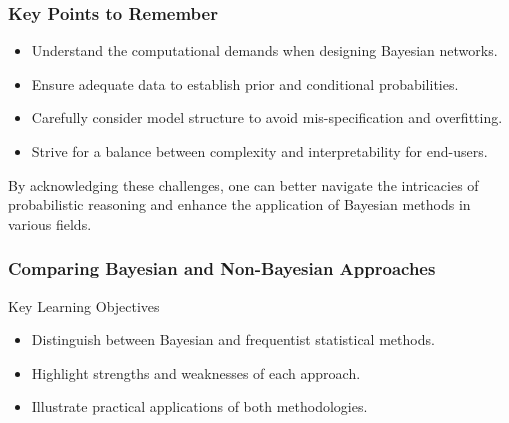 \documentclass[aspectratio=169]{beamer}
\begin{document}
\begin{frame}[fragile]
    \frametitle{Key Points to Remember}
    \begin{itemize}
        \item Understand the computational demands when designing Bayesian networks.
        \item Ensure adequate data to establish prior and conditional probabilities.
        \item Carefully consider model structure to avoid mis-specification and overfitting.
        \item Strive for a balance between complexity and interpretability for end-users.
    \end{itemize}
    
    \vspace{1em}
    By acknowledging these challenges, one can better navigate the intricacies of probabilistic reasoning and enhance the application of Bayesian methods in various fields.
\end{frame}

\begin{frame}[fragile]
    \frametitle{Comparing Bayesian and Non-Bayesian Approaches}
    
    \begin{block}{Key Learning Objectives}
        \begin{itemize}
            \item Distinguish between Bayesian and frequentist statistical methods.
            \item Highlight strengths and weaknesses of each approach.
            \item Illustrate practical applications of both methodologies.
        \end{itemize}
    \end{block}
\end{frame}
\end{document}
